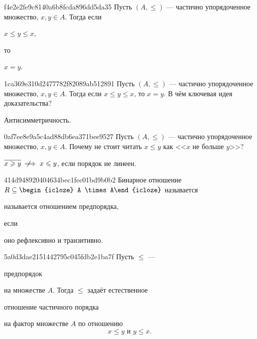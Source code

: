 \begin{note}{f4e2e2fe9c8140a6b8fcda896dd5da35}
    Пусть \({ (A, \leqslant) }\) --- частично упорядоченное множество, \({ x, y \in A }\).
    Тогда если \begin{icloze}{2}\({ x \leqslant y \leqslant x }\),\end{icloze} то \begin{icloze}{1}\({ x = y }\).\end{icloze}
\end{note}

\begin{note}{1ca369e310d2477782f82089ab512891}
    Пусть \({ (A, \leqslant) }\) --- частично упорядоченное множество, \({ x, y \in A }\).
    Тогда если \({ x \leqslant y \leqslant x }\), то \({ x = y }\).
    В чём ключевая идея доказательства?

    \begin{cloze}{1}
        Антисимметричность.
    \end{cloze}
\end{note}

\begin{note}{0af7ee8e9a5c4ad88db6ea371bee9527}
    Пусть \({ (A, \leqslant) }\) --- частично упорядоченное множество, \({ x, y \in A }\).
    Почему не стоит читать \({ x \leqslant y }\) как <<\({ x }\) не больше \({ y }\)>>?

    \begin{cloze}{1}
        \({ \overline{x \geqslant y} \:\:\not\!\!\!\implies x \leqslant y }\), если порядок не линеен.
    \end{cloze}
\end{note}

\begin{note}{414d948920404634bec1fec01bd9b0b2}
    Бинарное отношение \({ R \subseteq \begin{icloze}{3}A \times A\end{icloze} }\) называется \begin{icloze}{2}называется отношением предпорядка,\end{icloze} если \begin{icloze}{1}оно рефлексивно и транзитивно.\end{icloze}
\end{note}

\begin{note}{5a0d3dae2151442795c045fdb2e1ba7f}
    Пусть \({ \leqslant }\) --- \begin{icloze}{3}предпорядок\end{icloze} на множестве \({ A }\).
    Тогда \({ \leqslant }\) задаёт естественное \begin{icloze}{2}отношение частичного порядка\end{icloze}
    \begin{icloze}{1}
        на фактор множестве \({ A }\) по отношению
        \[
            x \leqslant y \text{ и } y \leqslant x.
        \]
    \end{icloze}
\end{note}

